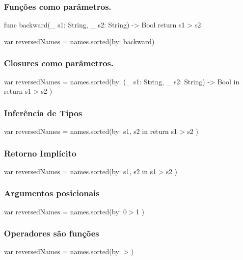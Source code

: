 \begin{frame}[fragile]
    \frametitle{Funções como parâmetros.}

    \begin{swift}
        func backward(_ s1: String, _ s2: String) -> Bool {
            return s1 > s2
        }

        var reversedNames = names.sorted(by: backward)
    \end{swift}
\end{frame}

\begin{frame}[fragile]
    \frametitle{Closures  como parâmetros.}

    \begin{swift}
    var reversedNames =
            names.sorted(by: {
               (_ s1: String, _ s2: String) -> Bool in
                    return s1 > s2
            })
    \end{swift}
\end{frame}

\begin{frame}[fragile]
    \frametitle{Inferência de Tipos}

    \begin{swift}
        var reversedNames = names.sorted(by: { s1, s2 in
                return s1 > s2
            })
    \end{swift}
\end{frame}

\begin{frame}[fragile]
    \frametitle{Retorno Implícito}

    \begin{swift}
        var reversedNames =
                names.sorted(by: { s1, s2 in s1 > s2 })
    \end{swift}
\end{frame}

\begin{frame}[fragile]
    \frametitle{Argumentos posicionais}

    \begin{swift}
        var reversedNames = names.sorted(by: { $0 > $1 })
    \end{swift}
\end{frame}

\begin{frame}[fragile]
    \frametitle{Operadores são funções}

    \begin{swift}
        var reversedNames = names.sorted(by: > )
    \end{swift}
\end{frame}

